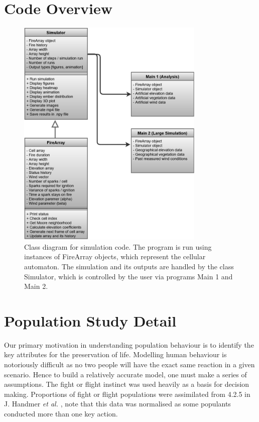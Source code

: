 \newpage
\appendix

\section{Code Overview}\label{code}

\begin{figure}[h!]\label{flowchartcode}
\centering
\includegraphics[width=0.8\textwidth]{Figures/FireArray.png}\caption{Class diagram for simulation code. The program is run using instances of FireArray objects, which represent the cellular automaton. The simulation and its outputs are handled by the class Simulator, which is controlled by the user via programs Main 1 and Main 2.}
\end{figure}

\section{Population Study Detail}\label{population_appendix}

Our primary motivation in understanding population behaviour is to identify the key attributes for the preservation of life. Modelling human behaviour is notoriously difficult as no two people will have the exact same reaction in a given scenario. Hence to build a relatively accurate model, one must make a series of assumptions. The fight or flight instinct was used heavily as a basis for decision making. Proportions of fight or flight populations were assimilated from 4.2.5 in J. Handmer \textit{et al.} \cite{J_Handmer}, note that this data was normalised as some populants conducted more than one key action.

